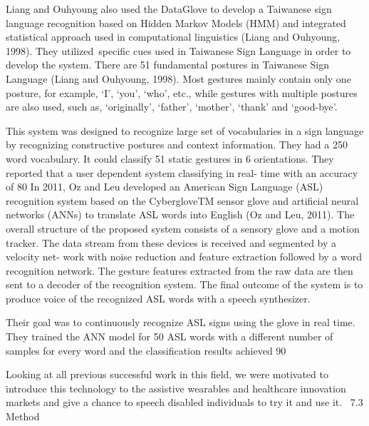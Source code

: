 Liang and Ouhyoung also used the DataGlove to develop a Taiwanese sign language recognition based on Hidden Markov Models (HMM) and integrated statistical approach used in computational linguistics (Liang and Ouhyoung, 1998). They utilized specific cues used in Taiwanese Sign Language in order to develop the system. There are 51 fundamental postures in Taiwanese Sign Language (Liang and Ouhyoung, 1998). Most gestures mainly contain only one posture, for example, ‘I’, ‘you’, ‘who’, etc., while gestures with multiple postures are also used, such as, ‘originally’, ‘father’, ‘mother’, ‘thank’ and ‘good-bye’. 

This system was designed to recognize large set of vocabularies in a sign language by recognizing constructive postures and context information. They had a 250 word vocabulary. It could classify 51 static gestures in 6 orientations. They reported that a user dependent system classifying in real- time with an accuracy of 80 %
In 2011, Oz and Leu developed an American Sign Language (ASL) recognition system based on the CybergloveTM sensor glove and artificial neural networks (ANNs) to translate ASL words into English (Oz and Leu, 2011). The overall structure of the proposed system consists of a sensory glove and a motion tracker. The data stream from these devices is received and segmented by a velocity net- work with noise reduction and feature extraction followed by a word recognition network. The gesture features extracted from the raw data are then sent to a decoder of the recognition system. The final outcome of the system is to produce voice of the recognized ASL words with a speech synthesizer. 

Their goal was to continuously recognize ASL signs using the glove in real time. They trained the ANN model for 50 ASL words with a different number of samples for every word and the classification results achieved 90%

Looking at all previous successful work in this field, we were motivated to introduce this technology to the assistive wearables and healthcare innovation markets and give a chance to speech disabled individuals to try it and use it. 
7.3 Method

